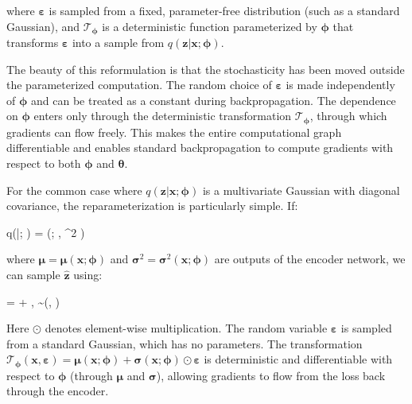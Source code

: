 where $\boldsymbol{\varepsilon}$ is sampled from a fixed, parameter-free distribution (such as a standard Gaussian), and $\mathcal{T}_{\boldsymbol{\phi}}$ is a deterministic function parameterized by $\boldsymbol{\phi}$ that transforms $\boldsymbol{\varepsilon}$ into a sample from $q(\mathbf{z}|\mathbf{x}; \boldsymbol{\phi})$.

The beauty of this reformulation is that the stochasticity has been moved outside the parameterized computation. The random choice of $\boldsymbol{\varepsilon}$ is made independently of $\boldsymbol{\phi}$ and can be treated as a constant during backpropagation. The dependence on $\boldsymbol{\phi}$ enters only through the deterministic transformation $\mathcal{T}_{\boldsymbol{\phi}}$, through which gradients can flow freely. This makes the entire computational graph differentiable and enables standard backpropagation to compute gradients with respect to both $\boldsymbol{\phi}$ and $\boldsymbol{\theta}$.

For the common case where $q(\mathbf{z}|\mathbf{x}; \boldsymbol{\phi})$ is a multivariate Gaussian with diagonal covariance, the reparameterization is particularly simple. If:
\begin{myequation}
q(|; \boldsymbol{\phi}) = (; \boldsymbol{\mu}, \boldsymbol{\sigma}^2 )
\end{myequation}

where $\boldsymbol{\mu} = \boldsymbol{\mu}(\mathbf{x}; \boldsymbol{\phi})$ and $\boldsymbol{\sigma}^2 = \boldsymbol{\sigma}^2(\mathbf{x}; \boldsymbol{\phi})$ are outputs of the encoder network, we can sample $\hat{\mathbf{z}}$ using:
\begin{myequation}
 = \boldsymbol{\mu} + \boldsymbol{\sigma} \odot \boldsymbol{\varepsilon}, \quad {} \boldsymbol{\varepsilon} \sim {}(, )
\end{myequation}

Here $\odot$ denotes element-wise multiplication. The random variable $\boldsymbol{\varepsilon}$ is sampled from a standard Gaussian, which has no parameters. The transformation $\mathcal{T}_{\boldsymbol{\phi}}(\mathbf{x}, \boldsymbol{\varepsilon}) = \boldsymbol{\mu}(\mathbf{x}; \boldsymbol{\phi}) + \boldsymbol{\sigma}(\mathbf{x}; \boldsymbol{\phi}) \odot \boldsymbol{\varepsilon}$ is deterministic and differentiable with respect to $\boldsymbol{\phi}$ (through $\boldsymbol{\mu}$ and $\boldsymbol{\sigma}$), allowing gradients to flow from the loss back through the encoder.

